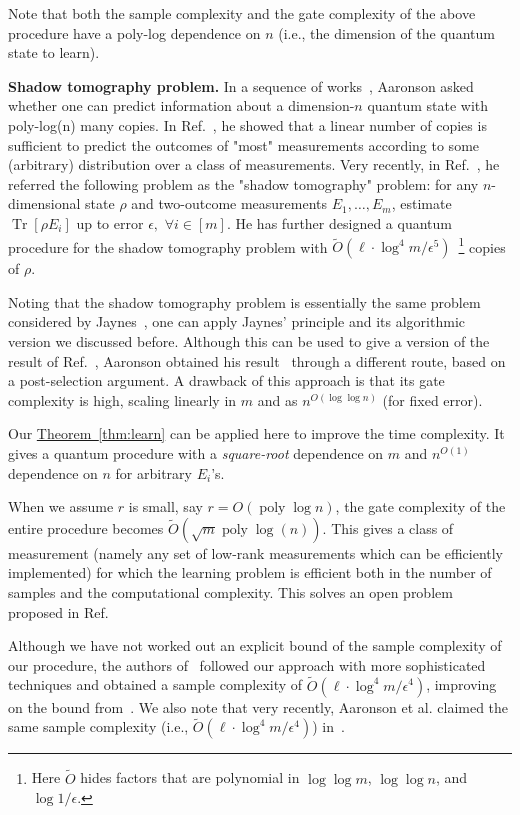 \documentclass[a4paper,UKenglish,cleveref, autoref]{lipics-v2019}
\theoremstyle{remark}
\numberwithin{equation}{section}
\numberwithin{oracle}{section}
\numberwithin{remark}{section}
\newcommand{\thm}[1]{\hyperref[thm:#1]{Theorem~\ref*{thm:#1}}}
\newcommand{\range}[1]{[#1]}
\newcommand{\eps}{\varepsilon}
\DeclareMathOperator{\poly}{poly}
\DeclareMathOperator{\Tr}{Tr}
\newcommand{\hd}[1]{\vspace{2mm} \noindent \textbf{#1}}
\def \eps {\epsilon}
\begin{document}
Note that both the sample complexity and the gate complexity of the above procedure have a poly-log dependence on $n$ (i.e., the dimension of the quantum state to learn).

\hd{Shadow tomography problem.} In a sequence of works~\cite{aaronson2007learnability, aaronson2017quantum}, Aaronson asked whether one can predict information about a dimension-$n$ quantum state with poly-log(n) many copies. In Ref.~\cite{aaronson2007learnability}, he showed that a linear number of copies is sufficient to predict the outcomes of "most" measurements according to some (arbitrary) distribution over a class of measurements. Very recently, in Ref.~\cite{aaronson2017quantum},  he referred the following problem as the "shadow tomography" problem: for any $n$-dimensional state $\rho$ and two-outcome measurements $E_{1},\ldots,E_{m}$, estimate  $\Tr[\rho E_{i}]$ up to error $\eps,$ $\forall i\in\range{m}$. He has further designed a quantum procedure for the shadow tomography problem with $\tilde{O}(\ell\cdot\log^{4}m/\eps^{5})$~\footnote{Here $\tilde{O}$ hides factors that are polynomial in $\log\log m$, $\log \log n$, and $\log 1/\epsilon$.} copies of $\rho$.

Noting that the shadow tomography problem is essentially the same problem considered by Jaynes~\cite{jaynes1957information}, one can apply Jaynes' principle and its algorithmic version we discussed before. Although this can be used to give a version of the result of Ref.~\cite{aaronson2017quantum}, Aaronson obtained his result~\cite{aaronson2017quantum} through a different route, based on a post-selection argument. A drawback of this approach is that its gate complexity is high, scaling linearly  in $m$ and as $n^{O(\log\log n)}$ (for fixed error).

Our \thm{learn} can be applied here to improve the time complexity. It gives a quantum procedure with a \emph{square-root} dependence on $m$ and $n^{O(1)}$ dependence on $n$ for arbitrary $E_i$'s.

When we assume $r$ is small, say $r=O(\poly\log n)$, the gate complexity of the entire procedure becomes $\tilde{O}(\sqrt{m}\poly \log (n))$. This gives a class of measurement (namely any set of low-rank measurements which can be efficiently implemented) for which the learning problem is efficient both in the number of samples and the computational complexity. This solves an open problem proposed in Ref.~\cite{aaronson2007learnability}

Although we have not worked out an explicit bound of the sample complexity of our procedure, the authors of~\cite{vAG18} followed our approach with more sophisticated techniques and obtained a sample complexity of $\tilde{O}(\ell\cdot\log^{4}m/\eps^{4})$, improving on the bound from~\cite{aaronson2017quantum}. We also note that very recently, Aaronson et al. claimed the same sample complexity (i.e., $\tilde{O}(\ell\cdot\log^{4}m/\eps^{4})$) in~\cite{ACHN18}.
\end{document}
